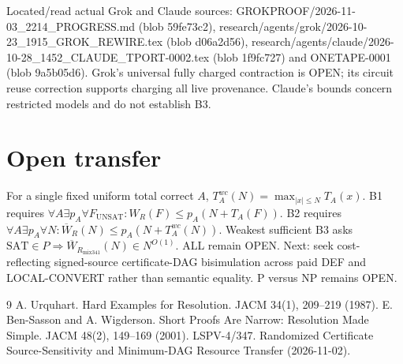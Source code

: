 \documentclass[11pt]{article}
\begin{document}
Located/read actual Grok and Claude sources: GROKPROOF/2026-11-03_2214_PROGRESS.md (blob 59fe73c2), research/agents/grok/2026-10-23_1915_GROK_REWIRE.tex (blob d06a2d56), research/agents/claude/2026-10-28_1452_CLAUDE_TPORT-0002.tex (blob 1f9fc727) and ONETAPE-0001 (blob 9a5b05d6). Grok's universal fully charged contraction is OPEN; its circuit reuse correction supports charging all live provenance. Claude's bounds concern restricted models and do not establish B3.

\section*{Open transfer}
For a single fixed uniform total correct $A$, $T_A^{wc}(N)=\max_{|x|\le N}T_A(x)$. B1 requires $\forall A\exists p_A\forall F_{\mathrm{UNSAT}}:W_R(F)\le p_A(N+T_A(F))$. B2 requires $\forall A\exists p_A\forall N:\overline W_R(N)\le p_A(N+T_A^{wc}(N))$. Weakest sufficient B3 asks $\mathrm{SAT}\in P\Rightarrow\overline W_{R_{\mathrm{mix341}}}(N)\in N^{O(1)}$. ALL remain OPEN. Next: seek cost-reflecting signed-source certificate-DAG bisimulation across paid DEF and LOCAL-CONVERT rather than semantic equality. P versus NP remains OPEN.

\begin{thebibliography}{9}
 A. Urquhart. Hard Examples for Resolution. JACM 34(1), 209--219 (1987).
 E. Ben-Sasson and A. Wigderson. Short Proofs Are Narrow: Resolution Made Simple. JACM 48(2), 149--169 (2001).
 LSPV-4/347. Randomized Certificate Source-Sensitivity and Minimum-DAG Resource Transfer (2026-11-02).
\end{thebibliography}
\end{document}
